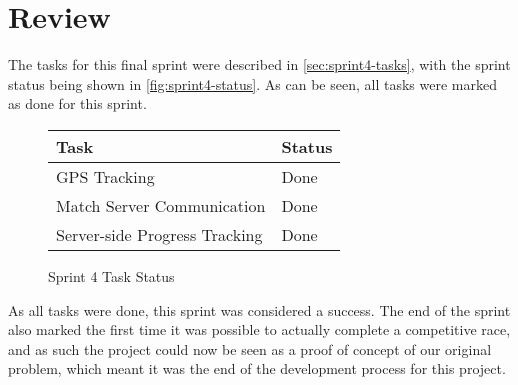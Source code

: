 \section{Review}
\label{sec:sprint4-review}

The tasks for this final sprint were described in \autoref{sec:sprint4-tasks}, with the sprint status being shown in \autoref{fig:sprint4-status}. As can be seen, all tasks were marked as done for this sprint.

\begin{figure}[ht!]
 \caption{Sprint 4 Task Status}
 \label{fig:sprint4-status}
 \begin{tabular}{|l|l|}
  \hline
  \textbf{Task} & \textbf{Status} \\
  \hline
  \ac{GPS} Tracking & Done \\
  \hline
  Match Server Communication & Done \\
  \hline
  Server-side Progress Tracking & Done \\
  \hline
 \end{tabular}
\end{figure}

As all tasks were done, this sprint was considered a success. The end of the sprint also marked the first time it was possible to actually complete a competitive race, and as such the project could now be seen as a proof of concept of our original problem, which meant it was the end of the development process for this project.
